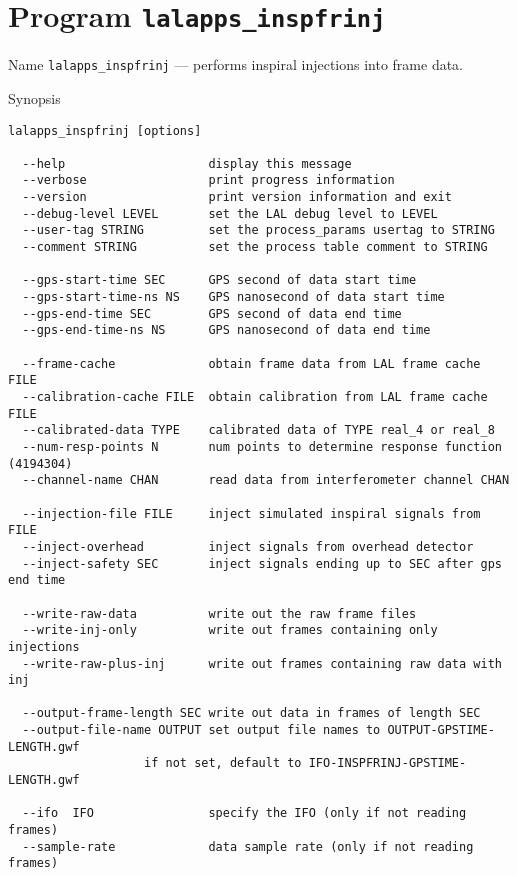 \section{Program \texttt{lalapps\_inspfrinj}}
\label{program:lalapps-inspfrinj}

\begin{entry}
\item[Name]
\verb$lalapps_inspfrinj$ --- performs inspiral injections into frame data.

\item[Synopsis]
\begin{verbatim}
lalapps_inspfrinj [options]
 
  --help                    display this message
  --verbose                 print progress information
  --version                 print version information and exit
  --debug-level LEVEL       set the LAL debug level to LEVEL
  --user-tag STRING         set the process_params usertag to STRING
  --comment STRING          set the process table comment to STRING
 
  --gps-start-time SEC      GPS second of data start time
  --gps-start-time-ns NS    GPS nanosecond of data start time
  --gps-end-time SEC        GPS second of data end time
  --gps-end-time-ns NS      GPS nanosecond of data end time
 
  --frame-cache             obtain frame data from LAL frame cache FILE
  --calibration-cache FILE  obtain calibration from LAL frame cache FILE
  --calibrated-data TYPE    calibrated data of TYPE real_4 or real_8
  --num-resp-points N       num points to determine response function (4194304)
  --channel-name CHAN       read data from interferometer channel CHAN
 
  --injection-file FILE     inject simulated inspiral signals from FILE
  --inject-overhead         inject signals from overhead detector
  --inject-safety SEC       inject signals ending up to SEC after gps end time
 
  --write-raw-data          write out the raw frame files
  --write-inj-only          write out frames containing only injections
  --write-raw-plus-inj      write out frames containing raw data with inj
 
  --output-frame-length SEC write out data in frames of length SEC
  --output-file-name OUTPUT set output file names to OUTPUT-GPSTIME-LENGTH.gwf
                   if not set, default to IFO-INSPFRINJ-GPSTIME-LENGTH.gwf
 
  --ifo  IFO                specify the IFO (only if not reading frames)
  --sample-rate             data sample rate (only if not reading frames)
\end{verbatim}


\end{entry}
